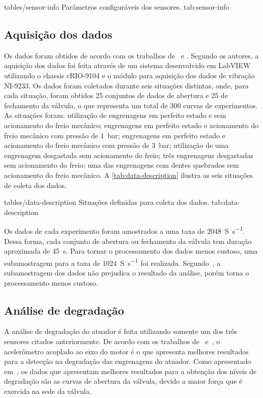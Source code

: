   {tables/sensor-info}
  {Parâmetros configuráveis dos sensores.}
  {tab:sensor-info}


\subsection{Aquisição dos dados}
\label{sub:estudo-caso-aquisicao-dados}

Os dados foram obtidos de acordo com os trabalhos de~\cite{boesch2011deteccao} e
\cite{faccin2011manutencao}. Segundo os autores, a aquisição dos dados foi feita através de um
sistema desenvolvido em LabVIEW utilizando o chassis {cRIO-9104} e o módulo para aquisição dos dados
de vibração {NI-9233}. Os dados foram coletados durante seis situações distintas, onde, para cada
situação, foram obtidos \num{25} conjuntos de dados de abertura e \num{25} de fechamento da válvula,
o que representa um total de \num{300} curvas de experimentos. As situações foram: utilização de
engrenagens em perfeito estado e sem acionamento do freio mecânico; engrenagens em perfeito estado e
acionamento do freio mecânico com pressão de \SI{1}{\bar}; engrenagens em perfeito estado e
acionamento do freio mecânico com pressão de \SI{3}{\bar}; utilização de uma engrenagem desgastada
sem acionamento do freio; três engrenagens desgastadas sem acionamento do freio; uma das engrenagens
com dentes quebrados sem acionamento do freio mecânico. A \cref{tab:data-description} ilustra as
seis situações de coleta dos dados.

  {tables/data-description}
  {Situações definidas para coleta dos dados.}
  {tab:data-description}

Os dados de cada experimento foram amostrados a uma taxa de \SI{2048}{S\per\second}. Dessa forma,
cada conjunto de abertura ou fechamento da válvula tem duração aproximada de \SI{45}{\second}. Para
tornar o processamento dos dados menos custoso, uma subamostragem para a taxa de
\SI{1024}{S\per\second} foi realizada. Segundo~\cite{faccin2011manutencao}, a subamostragem dos
dados não prejudica o resultado da análise, porém torna o processamento menos custoso.


\subsection{Análise de degradação}
\label{sub:estudo-caso-analise-degradacao}

A análise de degradação do atuador é feita utilizando somente um dos três sensores citados
anteriormente. De acordo com os trabalhos de~\cite{boesch2011deteccao}
e~\cite{faccin2011manutencao}, o acelerômetro acoplado ao eixo do motor é o que apresenta melhores
resultados para a detecção na degradação das engrenagens do atuador. Como apresentado
em~\cite{lazzaretti2012avaliacao}, os dados que apresentam melhores resultados para a obtenção dos
níveis de degradação são as curvas de abertura da válvula, devido a maior força que é exercida na
sede da válvula.

